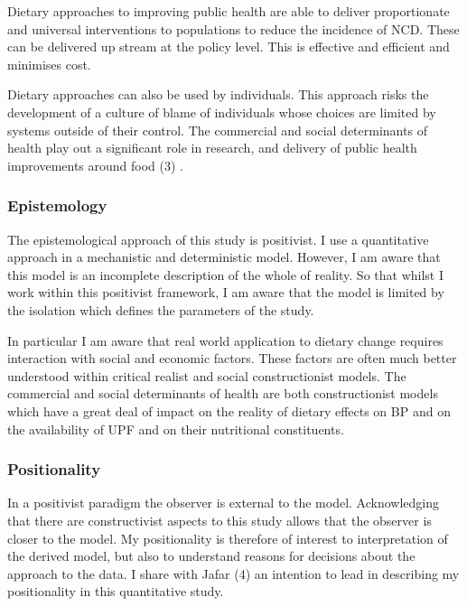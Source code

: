 \documentclass[
]{article}
\begin{document}
Dietary approaches to improving public health are able to deliver
proportionate and universal interventions to populations to reduce the
incidence of NCD. These can be delivered up stream at the policy level.
This is effective and efficient and minimises cost.

Dietary approaches can also be used by individuals. This approach risks
the development of a culture of blame of individuals whose choices are
limited by systems outside of their control. The commercial and social
determinants of health play out a significant role in research, and
delivery of public health improvements around food (3) .

\hypertarget{epistemology}{%
\subsubsection{Epistemology}\label{epistemology}}

The epistemological approach of this study is positivist. I use a
quantitative approach in a mechanistic and deterministic model. However,
I am aware that this model is an incomplete description of the whole of
reality. So that whilst I work within this positivist framework, I am
aware that the model is limited by the isolation which defines the
parameters of the study.

In particular I am aware that real world application to dietary change
requires interaction with social and economic factors. These factors are
often much better understood within critical realist and social
constructionist models. The commercial and social determinants of health
are both constructionist models which have a great deal of impact on the
reality of dietary effects on BP and on the availability of UPF and on
their nutritional constituents.

\hypertarget{positionality}{%
\subsubsection{Positionality}\label{positionality}}

In a positivist paradigm the observer is external to the model.
Acknowledging that there are constructivist aspects to this study allows
that the observer is closer to the model. My positionality is therefore
of interest to interpretation of the derived model, but also to
understand reasons for decisions about the approach to the data. I share
with Jafar (4) an intention to lead in describing my positionality in
this quantitative study.
\end{document}
